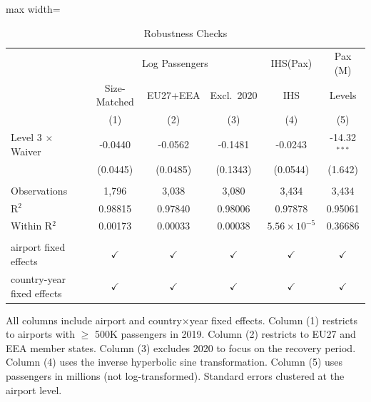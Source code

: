 
\begin{table}[htbp]
   \caption{\label{tab:robustness} Robustness Checks}
   \bigskip
   \centering
   \begin{adjustbox}{max width=\textwidth}
   \begin{tabular}{lccccc}
      \toprule
       & \multicolumn{3}{c}{Log Passengers} & IHS(Pax) & Pax (M)\\
                                 & Size-Matched  & EU27+EEA      & Excl.~2020    & IHS                   & Levels \\   
                                 & (1)           & (2)           & (3)           & (4)                   & (5)\\  
      \midrule 
      Level 3 $\times$ Waiver          & -0.0440       & -0.0562       & -0.1481       & -0.0243               & -14.32$^{***}$\\   
                                 & (0.0445)      & (0.0485)      & (0.1343)      & (0.0544)              & (1.642)\\   
       \\
      Observations               & 1,796         & 3,038         & 3,080         & 3,434                 & 3,434\\  
      R$^2$                      & 0.98815       & 0.97840       & 0.98006       & 0.97878               & 0.95061\\  
      Within R$^2$               & 0.00173       & 0.00033       & 0.00038       & $5.56\times 10^{-5}$  & 0.36686\\  
       \\
      airport fixed effects      & $\checkmark$  & $\checkmark$  & $\checkmark$  & $\checkmark$          & $\checkmark$\\   
      country-year fixed effects & $\checkmark$  & $\checkmark$  & $\checkmark$  & $\checkmark$          & $\checkmark$\\   
      \bottomrule
   \end{tabular}
   \end{adjustbox}

   \par \raggedright 
   All columns include airport and country$\times$year fixed effects. Column (1) restricts to airports with $\geq$ 500K passengers in 2019. Column (2) restricts to EU27 and EEA member states. Column (3) excludes 2020 to focus on the recovery period. Column (4) uses the inverse hyperbolic sine transformation. Column (5) uses passengers in millions (not log-transformed). Standard errors clustered at the airport level.
\end{table}


